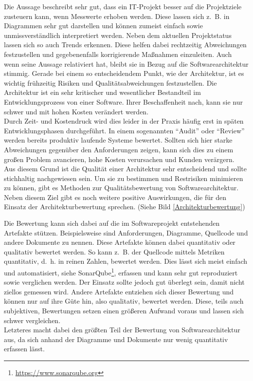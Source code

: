 Die Aussage beschreibt sehr gut, dass ein IT-Projekt besser auf die Projektziele
zusteuern kann, wenn Messwerte erhoben werden. Diese lassen sich z.~B. in Diagrammen sehr gut darstellen und können zumeist einfach sowie unmissverständlich interpretiert werden. Neben dem aktuellen Projektstatus lassen sich so auch Trends erkennen. Diese helfen dabei rechtzeitig Abweichungen festzustellen und gegebenenfalls korrigierende Maßnahmen einzuleiten\cite{Starke2015}. Auch wenn \citeauthor{DeMarco2009} \citeyear{DeMarco2009} seine Aussage relativiert hat\cite{DeMarco2009}, bleibt sie in Bezug auf die Softwarearchitektur stimmig.
Gerade bei einem so entscheidendem Punkt, wie der Architektur, ist es wichtig frühzeitig
Risiken und Qualitätsabweichungen festzustellen. Die Architektur ist ein sehr kritischer
und wesentlicher Bestandteil im Entwicklungsprozess von einer Software. Ihrer Beschaffenheit nach,
kann sie nur schwer und mit hohen Kosten verändert werden.\\
Durch Zeit- und Kostendruck wird dies leider in der Praxis häufig erst in späten Entwicklungsphasen durchgeführt. 
In einem sogenannten \enquote{Audit} oder \enquote{Review} werden bereits produktiv laufende Systeme bewertet\cite{Starke2015}.
Sollten sich hier starke Abweichungen gegenüber den Anforderungen zeigen, kann sich dies zu einem großen Problem 
avancieren, hohe Kosten verursachen und Kunden verärgern.\\
Aus diesem Grund ist die Qualität einer Architektur sehr entscheidend und sollte stichhaltig nachgewiesen sein.
Um sie zu bestimmen und Restrisiken minimieren zu können, gibt es Methoden zur Qualitätsbewertung 
von Softwarearchitektur. Neben diesem Ziel gibt es noch weitere positive Auswirkungen, die für den Einsatz der Architekturbewertung sprechen. (Siehe Bild \ref{Architekturbewertung})


Die Bewertung kann sich dabei auf die im Softwareprojekt entstehenden Artefakte stützen. Beispielsweise sind
Anforderungen, Diagramme, Quellcode und andere Dokumente zu nennen. Diese Artefakte können dabei quantitativ 
oder qualitativ bewertet werden. So kann z.~B. der Quellcode mittels Metriken quantitativ, d.~h. in reinen Zahlen, bewertet werden. Dies lässt sich meist einfach und automatisiert, siehe SonarQube\footnote{\url{https://www.sonarqube.org}}, erfassen und kann sehr gut reproduziert sowie verglichen werden. Der Einsatz sollte jedoch gut überlegt sein, damit nicht ziellos gemessen wird.
Andere Artefakte entziehen sich dieser Bewertung und können nur auf ihre Güte hin, also qualitativ, bewertet werden. Diese, teils auch subjektiven, Bewertungen setzen einen größeren Aufwand voraus und lassen sich schwer vergleichen.\\  
Letzteres macht dabei den größten Teil der Bewertung von Softwarearchitektur aus, da sich anhand der Diagramme und Dokumente nur wenig quantitativ erfassen lässt.     

